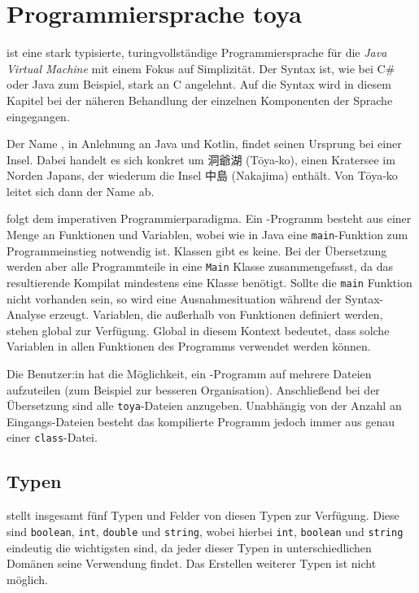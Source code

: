 \chapter{Programmiersprache toya}
\label{cha:toya}

\Toya ist eine stark typisierte, turing\-vollständige Programmiersprache für die \textit{Java Virtual Machine} mit einem Fokus auf Simplizität. Der Syntax ist, wie bei C\# oder Java zum Beispiel, stark an C angelehnt. Auf die Syntax wird in diesem Kapitel bei der näheren Behandlung der einzelnen Komponenten der Sprache eingegangen. 

\begin{CJK}{UTF8}{ipxm}
Der Name \toya, in Anlehnung an Java und Kotlin, findet seinen Ursprung bei einer Insel. Dabei handelt es sich konkret um 洞爺湖 (Tōya-ko), einen Kratersee im Norden Japans, der wiederum die Insel 中島 (Nakajima) enthält. Von Tōya-ko leitet sich dann der Name \toya ab.
\end{CJK}

\Toya folgt dem imperativen Programmierparadigma. Ein \toya-Programm besteht aus einer Menge an Funktionen und Variablen, wobei wie in Java eine \texttt{main}-Funktion zum Programmeinstieg notwendig ist. Klassen gibt es keine. Bei der Übersetzung werden aber alle Programmteile in eine \texttt{Main} Klasse zusammengefasst, da das resultierende Kompilat mindestens eine Klasse benötigt. Sollte die \texttt{main} Funktion nicht vorhanden sein, so wird eine Ausnahmesituation während der Syntax-Analyse erzeugt. Variablen, die außerhalb von Funktionen definiert werden, stehen global zur Verfügung. Global in diesem Kontext bedeutet, dass solche Variablen in allen Funktionen des Programms verwendet werden können.

Die Benutzer:in hat die Möglichkeit, ein \toya-Programm auf mehrere Dateien aufzuteilen (zum Beispiel zur besseren Organisation). Anschließend bei der Übersetzung sind alle \texttt{toya}-Dateien anzugeben. Unabhängig von der Anzahl an Eingangs-Dateien besteht das kompilierte Programm jedoch immer aus genau einer \texttt{class}-Datei.  

\section{Typen}

\toya stellt insgesamt fünf Typen und Felder von diesen Typen zur Verfügung. Diese sind \texttt{boolean}, \texttt{int}, \texttt{double} und \texttt{string}, wobei hierbei \texttt{int}, \texttt{boolean} und \texttt{string} eindeutig die wichtigsten sind, da jeder dieser Typen in unterschiedlichen Domänen seine Verwendung findet. Das Erstellen weiterer Typen ist nicht möglich.

